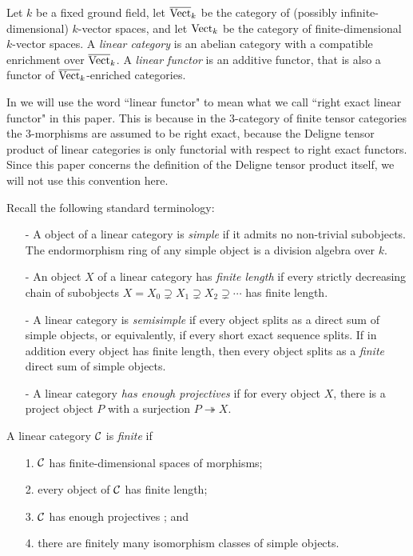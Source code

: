 \documentclass{amsart}
\begin{document}
	Let $k$ be a fixed ground field, let $\overline{\mathrm{Vect}}_k$ be the category of (possibly infinite-dimensional) $k$-vector spaces, and let $\mathrm{Vect}_k$ be the category of finite-dimensional $k$-vector spaces.   A {\em linear category} is an abelian category with a compatible enrichment over $\overline{\mathrm{Vect}}_k$.  
A {\em linear functor} is an additive functor, that is also a functor of $\overline{\mathrm{Vect}}_k$-enriched categories. 

\begin{warning}
	In \cite{3TC, DTCI} we will use the word ``linear functor" to mean what we call ``right exact linear functor" in this paper.  This is because in the $3$-category of finite tensor categories the $3$-morphisms are assumed to be right exact, because the Deligne tensor product of linear categories is only functorial with respect to right exact functors.  Since this paper concerns the definition of the Deligne tensor product itself, we will not use this convention here.
\end{warning}

Recall the following standard terminology:
\begin{itemize}
	\item[-] A object of a linear category is {\em simple} if it admits no non-trivial subobjects. The endormorphism ring of any simple object is a division algebra over $k$. 
	\item[-] An object $X$ of a linear category has {\em finite length} if every strictly decreasing chain of subobjects $X = X_0 \supsetneq X_1 \supsetneq X_2 \supsetneq  \cdots$ has finite length. 
	\item[-] A linear category is {\em semisimple} if every object splits as a direct sum of simple objects, or equivalently, if every short exact sequence splits. If in addition every object has finite length, then every object splits as a {\em finite} direct sum of simple objects.
	\item[-] A linear category {\em has enough projectives} if for every object $X$, there is a project object $P$ with a surjection $P \twoheadrightarrow X$. 
\end{itemize}


\begin{definition} %
	A linear category $\mathcal C$ is {\em finite} if 
	\begin{enumerate}
		\item[1.] $\mathcal C$ has finite-dimensional spaces of morphisms;
		\item[2.] every object of $\mathcal C$ has finite length;
		\item[3.] $\mathcal C$ has enough projectives%
		; and
		\item[4.] there are finitely many isomorphism classes of simple objects.  
	\end{enumerate}
\end{definition}
\end{document}
